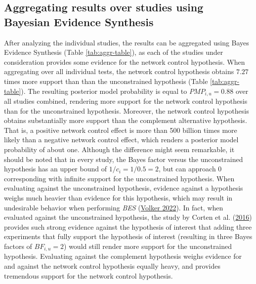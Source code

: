 \documentclass[
  11pt,
]{article}
\begin{document}
\hypertarget{aggregating-results-over-studies-using-bayesian-evidence-synthesis}{%
\subsection{Aggregating results over studies using Bayesian Evidence Synthesis}\label{aggregating-results-over-studies-using-bayesian-evidence-synthesis}}

After analyzing the individual studies, the results can be aggregated using Bayes Evidence Synthesis (Table \ref{tab:aggr-table}), as each of the studies under consideration provides some evidence for the network control hypothesis.
When aggregating over all individual tests, the network control hypothesis obtains \(7.27\) times more support than than the unconstrained hypothesis (Table \ref{tab:aggr-table}).
The resulting posterior model probability is equal to \(PMP_{i,u} = 0.88\) over all studies combined, rendering more support for the network control hypothesis than for the unconstrained hypothesis.
Moreover, the network control hypothesis obtains substantially more support than the complement alternative hypothesis.
That is, a positive network control effect is more than 500 billion times more likely than a negative network control effect, which renders a posterior model probability of about one.
Although the difference might seem remarkable, it should be noted that in every study, the Bayes factor versus the unconstrained hypothesis has an upper bound of \(1/c_i = 1/0.5 = 2\), but can approach \(0\) corresponding with infinite support for the unconstrained hypothesis.
When evaluating against the unconstrained hypothesis, evidence against a hypothesis weighs much heavier than evidence for this hypothesis, which may result in undesirable behavior when performing \emph{BES} (\protect\hyperlink{ref-volker_bes_2022}{Volker 2022}).
In fact, when evaluated against the unconstrained hypothesis, the study by Corten et al. (\protect\hyperlink{ref-corten_etal_reputation_2016}{2016}) provides such strong evidence against the hypothesis of interest that adding three experiments that fully support the hypothesis of interest (resulting in three Bayes factors of \(BF_{i,u} = 2\)) would still render more support for the unconstrained hypothesis.
Evaluating against the complement hypothesis weighs evidence for and against the network control hypothesis equally heavy, and provides tremendous support for the network control hypothesis.
\end{document}
